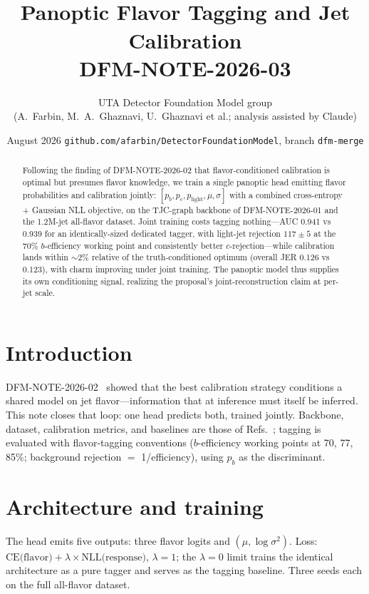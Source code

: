 \documentclass[11pt]{article}
\title{\vspace{-1.2cm}{\color{red!70!black}\small\bfseries INTERNAL DRAFT --- UTA DFM GROUP --- NOT AN OFFICIAL ATLAS DOCUMENT}\\[2mm]
\Large Panoptic Flavor Tagging and Jet Calibration\\[1mm]
\normalsize DFM-NOTE-2026-03}
\author{\small UTA Detector Foundation Model group\\
\small (A.~Farbin, M.~A.~Ghaznavi, U.~Ghaznavi et al.; analysis assisted by Claude)}
\date{\small August 2026 \;\textbullet\; \texttt{github.com/afarbin/DetectorFoundationModel}, branch \texttt{dfm-merge}}
\begin{document}
\maketitle

\begin{abstract}
Following the finding of DFM-NOTE-2026-02 that flavor-conditioned calibration is
optimal but presumes flavor knowledge, we train a single panoptic head emitting
flavor probabilities and calibration jointly: $[p_b,p_c,p_\text{light},\mu,\sigma]$
with a combined cross-entropy + Gaussian NLL objective, on the TJC-graph backbone of
DFM-NOTE-2026-01 and the 1.2M-jet all-flavor dataset. Joint training costs tagging
nothing---AUC 0.941 vs 0.939 for an identically-sized dedicated tagger, with
light-jet rejection $117\pm5$ at the 70\% $b$-efficiency working point and
consistently better $c$-rejection---while calibration lands within ${\sim}2\%$
relative of the truth-conditioned optimum (overall JER 0.126 vs 0.123), with charm
improving under joint training. The panoptic model thus supplies its own conditioning
signal, realizing the proposal's joint-reconstruction claim at per-jet scale.
\end{abstract}

\section{Introduction}
DFM-NOTE-2026-02~\cite{note2} showed that the best calibration strategy conditions a
shared model on jet flavor---information that at inference must itself be inferred.
This note closes that loop: one head predicts both, trained jointly. Backbone,
dataset, calibration metrics, and baselines are those of
Refs.~\cite{note1,note2}; tagging is evaluated with flavor-tagging conventions
($b$-efficiency working points at 70, 77, 85\%; background rejection $=$
1/efficiency), using $p_b$ as the discriminant.

\section{Architecture and training}
The head emits five outputs: three flavor logits and $(\mu,\log\sigma^2)$. Loss:
$\text{CE(flavor)}+\lambda\times\text{NLL(response)}$, $\lambda=1$; the $\lambda=0$
limit trains the identical architecture as a pure tagger and serves as the tagging
baseline. Three seeds each on the full all-flavor dataset.
\end{document}
